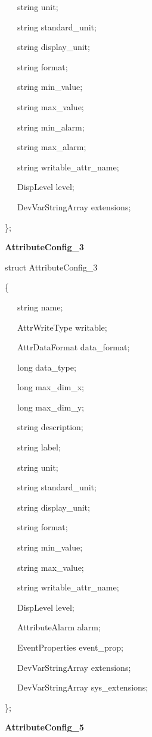 ~~~string unit;

~~~string standard\_unit;

~~~string display\_unit;

~~~string format;

~~~string min\_value;

~~~string max\_value;

~~~string min\_alarm;

~~~string max\_alarm;

~~~string writable\_attr\_name;

~~~DispLevel level;

~~~DevVarStringArray extensions;

\};\\


\begin{flushleft}
\textbf{AttributeConfig\_3}
\par\end{flushleft}

struct AttributeConfig\_3

\{

~~~string name;

~~~AttrWriteType writable;

~~~AttrDataFormat data\_format;

~~~long data\_type;

~~~long max\_dim\_x;

~~~long max\_dim\_y;

~~~string description;

~~~string label;

~~~string unit;

~~~string standard\_unit;

~~~string display\_unit;

~~~string format;

~~~string min\_value;

~~~string max\_value;

~~~string writable\_attr\_name;

~~~DispLevel level;

~~~AttributeAlarm alarm;

~~~EventProperties event\_prop;

~~~DevVarStringArray extensions;

~~~DevVarStringArray sys\_extensions;

\};\\


\begin{flushleft}
\textbf{AttributeConfig\_5}
\par\end{flushleft}

